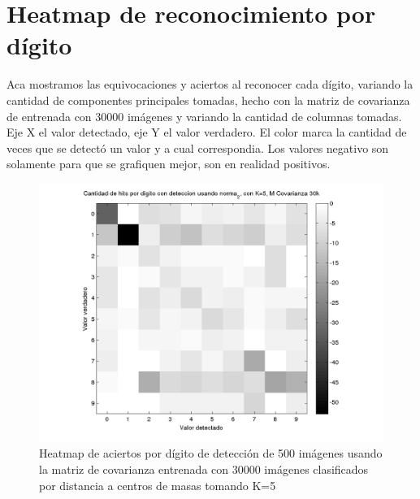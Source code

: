 \section{Heatmap de reconocimiento por d\'igito}
Aca mostramos las equivocaciones y aciertos al reconocer cada d\'igito, variando la cantidad de componentes principales tomadas, hecho con la matriz de covarianza de
entrenada con 30000 im\'agenes y variando la cantidad de columnas tomadas. Eje X el valor detectado, eje Y el valor verdadero. El color marca la cantidad
de veces que se detect\'o un valor y a cual correspondia. Los valores negativo son solamente para que se grafiquen mejor,
son en realidad positivos.

\def \hmwidth {500pt}
\begin{figure}[H]
\includegraphics[width=\hmwidth]{plots/heatmap-30kcv-k5-norma_2.png}
\caption{Heatmap de aciertos por d\'igito de detecci\'on de 500 im\'agenes usando la matriz de covarianza entrenada con 30000 im\'agenes
clasificados por distancia a centros de masas tomando K=5}
\label{fig:HM30kcv-k5}
\end{figure}

